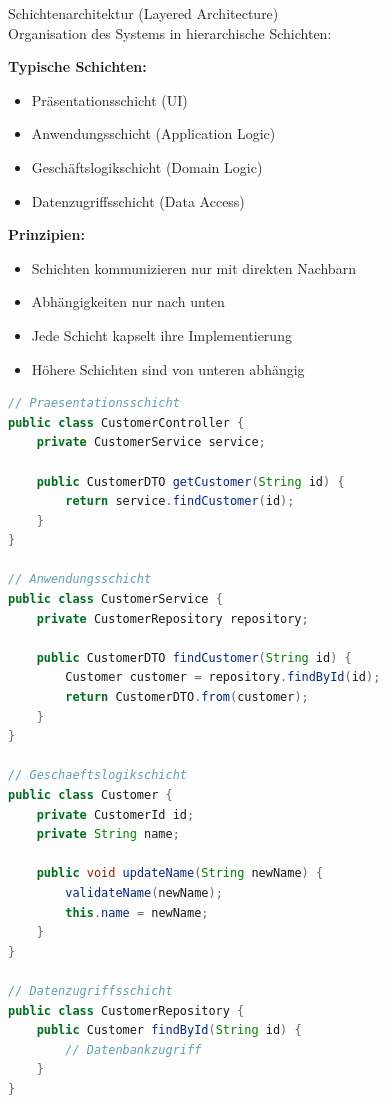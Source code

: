 \begin{concept}{Schichtenarchitektur (Layered Architecture)}\\
Organisation des Systems in hierarchische Schichten:

\textbf{Typische Schichten:}
\begin{itemize}
    \item Präsentationsschicht (UI)
    \item Anwendungsschicht (Application Logic)
    \item Geschäftslogikschicht (Domain Logic)
    \item Datenzugriffsschicht (Data Access)
\end{itemize}

\textbf{Prinzipien:}
\begin{itemize}
    \item Schichten kommunizieren nur mit direkten Nachbarn
    \item Abhängigkeiten nur nach unten
    \item Jede Schicht kapselt ihre Implementierung
    \item Höhere Schichten sind von unteren abhängig
\end{itemize}

\begin{lstlisting}[language=Java, style=basesmol]
// Praesentationsschicht
public class CustomerController {
    private CustomerService service;
    
    public CustomerDTO getCustomer(String id) {
        return service.findCustomer(id);
    }
}

// Anwendungsschicht
public class CustomerService {
    private CustomerRepository repository;
    
    public CustomerDTO findCustomer(String id) {
        Customer customer = repository.findById(id);
        return CustomerDTO.from(customer);
    }
}

// Geschaeftslogikschicht
public class Customer {
    private CustomerId id;
    private String name;
    
    public void updateName(String newName) {
        validateName(newName);
        this.name = newName;
    }
}

// Datenzugriffsschicht
public class CustomerRepository {
    public Customer findById(String id) {
        // Datenbankzugriff
    }
}
\end{lstlisting}
\end{concept}

